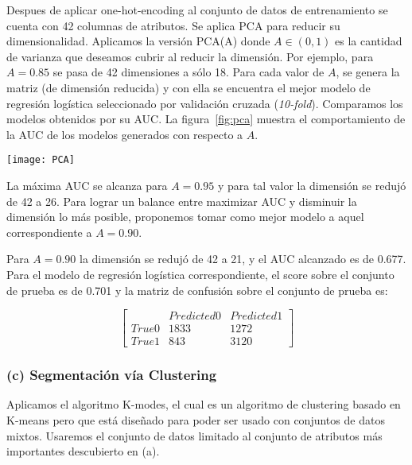 \documentclass[letterpaper,11pt]{article}
\newenvironment{Figure}
  {\par\medskip\noindent\minipage{\linewidth}}
  {\endminipage\par\medskip}
\begin{document}
\begin{multicols}{2}
Despues de aplicar one-hot-encoding al conjunto de datos de entrenamiento se cuenta con 42 columnas de
atributos. Se aplica PCA para reducir su dimensionalidad. Aplicamos la versión PCA(A) donde $A\in (0,1)$ es la cantidad
de varianza que deseamos cubrir al reducir la dimensión. Por ejemplo, para $A=0.85$ se pasa de 42 dimensiones a sólo 18.
Para cada valor de $A$, se genera la matriz (de dimensión reducida) y con ella se encuentra el mejor modelo de regresión
logística seleccionado por validación cruzada (\emph{10-fold}). Comparamos los modelos obtenidos por su AUC. 
La figura~\ref{fig:pca} muestra el comportamiento de la AUC de los modelos generados con respecto a $A$.  

\begin{Figure}
    \centering
    \texttt{[image: PCA]}
    \label{fig:pca}
\end{Figure}
La máxima AUC se alcanza para $A=0.95$ y para tal valor la dimensión se redujó de 42 a 26. Para lograr un balance entre
maximizar AUC y disminuir la dimensión lo más posible, proponemos tomar como mejor modelo a aquel correspondiente a
$A=0.90$. 

Para $A=0.90$ la dimensión se redujó de 42 a 21, y el AUC alcanzado es de 0.677. Para el modelo de regresión logística
correspondiente, el score sobre el conjunto de prueba es de 0.701 y la matriz de confusión sobre el conjunto de prueba
es:

\[\begin{bmatrix}
        & Predicted 0 & Predicted  1 \\
   True 0 & 1833 & 1272\\
   True 1 & 843 &3120
 \end{bmatrix}\]


\subsubsection*{(c) Segmentación vía Clustering} 
Aplicamos el algoritmo K-modes, el cual es un algoritmo de clustering basado en K-means pero que está diseñado para
poder ser usado con conjuntos de datos mixtos\cite{kmodes}. Usaremos el conjunto de datos limitado al conjunto de atributos más
importantes descubierto en (a). 


\end{multicols}
\end{document}
